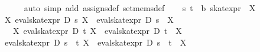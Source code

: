 \begin{isabellebody}
\ \ \ \ \isamarkupfalse%
\ {}auto\ simp\ add{}\ assigns{}def\ set{}mems{}def{}\isanewline
{}\isamarkupfalse%
\isanewline
\ \ \isamarkupfalse%
\ s\ t\ {}{}\ {}{}b\ skat{}expr{}\ \ X\isanewline
\ \ \isamarkupfalse%
\ {}{}X{}\ eval{}skat{}expr\ D\ s\ {}{}X{}\ {}\ {}eval{}skat{}expr\ D\ s\ {}\ X{}\isanewline
\ \ \ {}{}X{}\ eval{}skat{}expr\ D\ t\ {}{}X{}\ {}\ {}eval{}skat{}expr\ D\ t\ {}\ X{}\isanewline
\ \ \isamarkupfalse%
\ {}eval{}skat{}expr\ D\ {}s\ {}\ t{}\ {}{}X{}\ {}\ {}eval{}skat{}expr\ D\ {}s\ {}\ t{}\ {}\ X{}\isanewline

\end{isabellebody}

